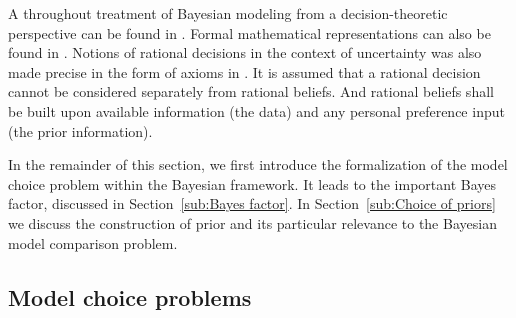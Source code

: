 A throughout treatment of Bayesian modeling from a decision-theoretic
perspective can be found in \cite{Robert:2007tc}. Formal mathematical
representations can also be found in \cite[][sec.~5.1 and
sec.~6.1]{Bernardo:1994vd}. Notions of rational decisions in the context of
uncertainty was also made precise in the form of axioms in
\cite{DeFinetti:1974tg,DeFinetti:1975ua}. It is assumed that a rational
decision cannot be considered separately from rational beliefs. And rational
beliefs shall be built upon available information (the data) and any personal
preference input (the prior information).

In the remainder of this section, we first introduce the formalization of the
model choice problem within the Bayesian framework. It leads to the important
Bayes factor, discussed in Section~\ref{sub:Bayes factor}. In
Section~\ref{sub:Choice of priors} we discuss the construction of prior and
its particular relevance to the Bayesian model comparison problem.

\subsection{Model choice problems}
\label{sub:Model choice problems}

